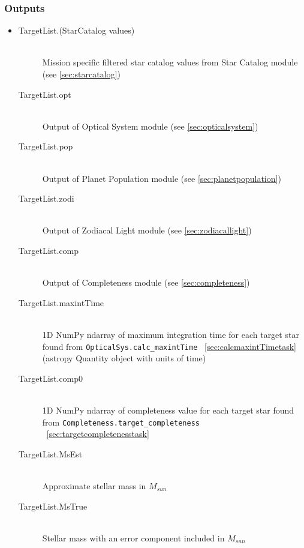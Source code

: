 \documentclass[cleanfoot]{asme2ej}
\begin{document}
\subsubsection*{Outputs}
\begin{itemize}
    \item 
    \begin{description}
        \item[TargetList.(StarCatalog values)] \hfill \\
        Mission specific filtered star catalog values from Star Catalog module (see \ref{sec:starcatalog})
        \item[TargetList.opt] \hfill \\
        Output of Optical System module (see \ref{sec:opticalsystem})
        \item[TargetList.pop] \hfill \\
        Output of Planet Population module (see \ref{sec:planetpopulation})
        \item[TargetList.zodi] \hfill \\
        Output of Zodiacal Light module (see \ref{sec:zodiacallight})
        \item[TargetList.comp] \hfill \\
        Output of Completeness module (see \ref{sec:completeness})
        \item[TargetList.maxintTime] \hfill \\
        1D NumPy ndarray of maximum integration time for each target star found from \verb+OpticalSys.calc_maxintTime+ ~\ref{sec:calcmaxintTimetask} (astropy Quantity object with units of time)
        \item[TargetList.comp0] \hfill \\
        1D NumPy ndarray of completeness value for each target star found from \verb+Completeness.target_completeness+ ~\ref{sec:targetcompletenesstask}
        \item[TargetList.MsEst] \hfill \\
        Approximate stellar mass in $ M_{sun} $
        \item[TargetList.MsTrue] \hfill \\
        Stellar mass with an error component included in $ M_{sun} $
    \end{description}
\end{itemize}

\end{document}
